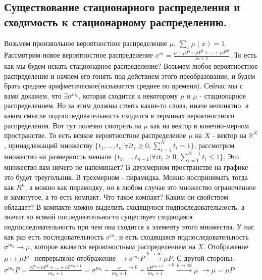 \subsection{Существование стационарного распределения и сходимость к стационарному распределению.}
Возьмем произвольное вероятностное распределение $\mu$. $\sum \limits_{x} \mu(x) = 1$.
Рассмотрим новое вероятностное распределение $\sigma^m = \frac{\mu + \mu P + \mu P^2 + ... + \mu P^m}{m+1}$.
То есть как мы будем искать стационарное распределение?
Возьмем любое вероятностное распределение и начнем его гонять под действием этого преобразование, и будем брать среднее арифметическое(называется среднее по времени).
Сейчас мы с вами докажем, что $\exists \sigma^{m_k}$, которая сходится к некоторому $\mu$ и $\mu$ - стационарное распределением. Но за этим должны стоять какие-то слова, иначе непонятно, в каком смысле подпоследовательность сходится в терминах вероятностного распределения. Вот тут полезно смотреть на $\mu$ как на вектор в конечно-мерном пространстве.
То есть всякое вероятностное распределение $\mu$ на $X$ - вектор на $\mathbb{R}^N$, принадлежащий множеству $\{t_1,...,t_n | \forall i  t_i \geq 0, \sum\limits_{i=1}^N t_i = 1\}$,
рассмотрим множество на размерность меньше $
    \{
        t_1,...,t_{n-1} |
        \forall i  t_i \geq 0,
        \sum\limits_{i=1}^{N-1}
        t_i \leq 1
    \}
$.
Это множество вам ничего не напоминает? В двухмерном пространстве на графике это будет треугольник. В трехмерном - пирамидка. Можно воспринимать тогда как $R^n$, а можно как пирамидку, но в любом случае это множество ограниченное и замкнутое, а то есть компакт. Что такое компакт? Каким он свойством обладает? В компакте можно выделить сходящуюся подпоследовательность, а значит во всякой последовательности существует сходящаяся подпоследовательность при чем она сходится к элементу этого множества. У нас как раз есть последовательность $\sigma^m$, и есть сходящаяся подпоследовательность $\sigma^{m_k} \to \mu$, которое является вероятностным распределением на $X$. Отображение $\mu \longmapsto \mu P$ - непрерывное отображение $\xrightarrow{} \sigma^{m_k} P \xrightarrow{k \to \infty} \mu P$.\newline
С другой стороны: $\sigma^{m_k} P = \frac{\nu P + \nu P^2 + ... + \nu P^{m_k + 1}}{m_k+1} = \sigma^{m_k} - \frac{\nu}{m_k + 1}^{\to 0} + \frac{\nu P^{m_k + 1}}{m_k + 1}^{\to 0} \xrightarrow{k \to \infty} \mu$ $\xrightarrow{} \mu = \mu P$